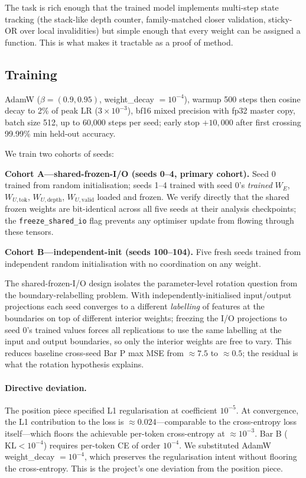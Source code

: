 \documentclass[11pt,letterpaper]{article}
\begin{document}
The task is rich enough that the trained model implements multi-step state tracking (the stack-like depth counter, family-matched closer validation, sticky-OR over local invalidities) but simple enough that every weight can be assigned a function. This is what makes it tractable as a proof of method.

\subsection{Training}

AdamW ($\beta = (0.9, 0.95)$, weight\_decay $= 10^{-4}$), warmup 500 steps then cosine decay to 2\% of peak LR ($3 \times 10^{-3}$), bf16 mixed precision with fp32 master copy, batch size 512, up to 60{,}000 steps per seed; early stop $+ 10{,}000$ after first crossing 99.99\% min held-out accuracy.

We train two cohorts of seeds:

\textbf{Cohort A---shared-frozen-I/O (seeds 0--4, primary cohort).} Seed 0 trained from random initialisation; seeds 1--4 trained with seed 0's \emph{trained} $W_E$, $W_{U,\mathrm{tok}}$, $W_{U,\mathrm{depth}}$, $W_{U,\mathrm{valid}}$ loaded and frozen. We verify directly that the shared frozen weights are bit-identical across all five seeds at their analysis checkpoints; the \texttt{freeze\_shared\_io} flag prevents any optimiser update from flowing through these tensors.

\textbf{Cohort B---independent-init (seeds 100--104).} Five fresh seeds trained from independent random initialisation with no coordination on any weight.

The shared-frozen-I/O design isolates the parameter-level rotation question from the boundary-relabelling problem. With independently-initialised input/output projections each seed converges to a different \emph{labelling} of features at the boundaries on top of different interior weights; freezing the I/O projections to seed 0's trained values forces all replications to use the same labelling at the input and output boundaries, so only the interior weights are free to vary. This reduces baseline cross-seed Bar P max MSE from $\approx 7.5$ to $\approx 0.5$; the residual is what the rotation hypothesis explains.

\paragraph{Directive deviation.} The position piece specified L1 regularisation at coefficient $10^{-5}$. At convergence, the L1 contribution to the loss is $\approx 0.024$---comparable to the cross-entropy loss itself---which floors the achievable per-token cross-entropy at $\approx 10^{-3}$. Bar B ($\mathrm{KL} < 10^{-4}$) requires per-token CE of order $10^{-4}$. We substituted AdamW weight\_decay $= 10^{-4}$, which preserves the regularisation intent without flooring the cross-entropy. This is the project's one deviation from the position piece.
\end{document}
